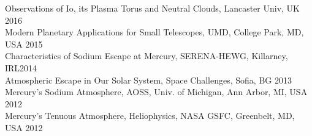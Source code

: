 \documentclass[12pt]{report}
\begin{document}
\noindent Observations of Io, its Plasma Torus and Neutral Clouds, Lancaster Univ, UK \hfill 2016\\
\noindent Modern Planetary Applications for Small Telescopes, UMD, College Park, MD, USA \hfill 2015\\
\noindent Characteristics of Sodium Escape at Mercury, SERENA-HEWG, Killarney, IRL\hfill 2014\\
\noindent Atmospheric Escape in Our Solar System, Space Challenges, Sofia, BG \hfill 2013\\
\noindent Mercury's Sodium Atmosphere, AOSS, Univ. of Michigan, Ann Arbor, MI, USA \hfill 2012\\
\noindent Mercury's Tenuous Atmosphere, Heliophysics, NASA GSFC, Greenbelt, MD, USA \hfill 2012\\
\end{document}
